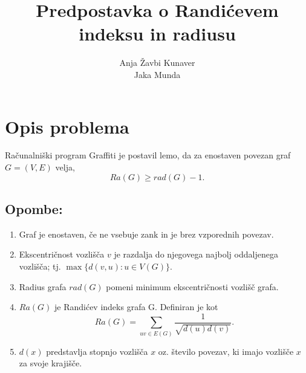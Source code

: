 \documentclass[a4paper, 10pt]{article}
\begin{document}
\title{Predpostavka o Randićevem indeksu in radiusu}
\author{Anja Žavbi Kunaver\\Jaka Munda}

\maketitle

\section{Opis problema}
Računalniški program Graffiti je postavil lemo, da za enostaven povezan graf $G=(V, E)$ velja, $$ Ra(G) \geq rad(G) -1.$$


\subsection*{Opombe:}
\begin{enumerate}
\item Graf je enostaven, če ne vsebuje zank in je brez vzporednih povezav.
\item Ekscentričnost vozlišča $v$ je razdalja do njegovega najbolj oddaljenega vozlišča; tj. $\max \{d(v,u) : u \in V(G) \}$.
\item Radius grafa $rad(G)$ pomeni minimum ekscentričnosti vozlišč grafa.
\item
$Ra(G)$ je Randićev indeks grafa G. Definiran je kot
$$Ra(G) = \sum_{uv \in E(G)} \frac{1}{\sqrt{d(u) d(v)}}.$$
\item $d(x)$ predstavlja stopnjo vozlišča $x$ oz. število povezav, ki imajo vozlišče $x$ za svoje krajišče.
\end{enumerate}


\end{document}
